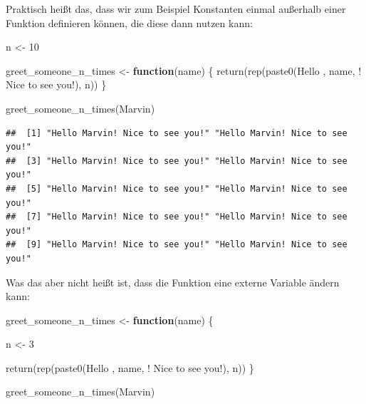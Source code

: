 \documentclass[
]{book}
\newenvironment{Shaded}{\begin{snugshade}}{\end{snugshade}}
\newcommand{\ControlFlowTok}[1]{\textcolor[rgb]{0.13,0.29,0.53}{\textbf{#1}}}
\newcommand{\DecValTok}[1]{\textcolor[rgb]{0.00,0.00,0.81}{#1}}
\newcommand{\FunctionTok}[1]{\textcolor[rgb]{0.00,0.00,0.00}{#1}}
\newcommand{\NormalTok}[1]{#1}
\newcommand{\OtherTok}[1]{\textcolor[rgb]{0.56,0.35,0.01}{#1}}
\newcommand{\StringTok}[1]{\textcolor[rgb]{0.31,0.60,0.02}{#1}}
\begin{document}
Praktisch heißt das, dass wir zum Beispiel Konstanten einmal außerhalb einer Funktion definieren können, die diese dann nutzen kann:

\begin{Shaded}
\begin{Highlighting}[]
\NormalTok{n }\OtherTok{\textless{}{-}} \DecValTok{10}

\NormalTok{greet\_someone\_n\_times }\OtherTok{\textless{}{-}} \ControlFlowTok{function}\NormalTok{(name) \{}
  \FunctionTok{return}\NormalTok{(}\FunctionTok{rep}\NormalTok{(}\FunctionTok{paste0}\NormalTok{(}\StringTok{\textquotesingle{}Hello \textquotesingle{}}\NormalTok{, }
\NormalTok{                    name, }
                    \StringTok{\textquotesingle{}! Nice to see you!\textquotesingle{}}\NormalTok{), }
\NormalTok{             n))}
\NormalTok{\}}

\FunctionTok{greet\_someone\_n\_times}\NormalTok{(}\StringTok{\textquotesingle{}Marvin\textquotesingle{}}\NormalTok{)}
\end{Highlighting}
\end{Shaded}

\begin{verbatim}
##  [1] "Hello Marvin! Nice to see you!" "Hello Marvin! Nice to see you!"
##  [3] "Hello Marvin! Nice to see you!" "Hello Marvin! Nice to see you!"
##  [5] "Hello Marvin! Nice to see you!" "Hello Marvin! Nice to see you!"
##  [7] "Hello Marvin! Nice to see you!" "Hello Marvin! Nice to see you!"
##  [9] "Hello Marvin! Nice to see you!" "Hello Marvin! Nice to see you!"
\end{verbatim}

Was das aber nicht heißt ist, dass die Funktion eine externe Variable ändern kann:

\begin{Shaded}
\begin{Highlighting}[]
\NormalTok{greet\_someone\_n\_times }\OtherTok{\textless{}{-}} \ControlFlowTok{function}\NormalTok{(name) \{}
  
\NormalTok{  n }\OtherTok{\textless{}{-}} \DecValTok{3}
  
  \FunctionTok{return}\NormalTok{(}\FunctionTok{rep}\NormalTok{(}\FunctionTok{paste0}\NormalTok{(}\StringTok{\textquotesingle{}Hello \textquotesingle{}}\NormalTok{, }
\NormalTok{                    name, }
                    \StringTok{\textquotesingle{}! Nice to see you!\textquotesingle{}}\NormalTok{), }
\NormalTok{             n))}
\NormalTok{\}}

\FunctionTok{greet\_someone\_n\_times}\NormalTok{(}\StringTok{\textquotesingle{}Marvin\textquotesingle{}}\NormalTok{)}
\end{Highlighting}
\end{Shaded}
\end{document}
